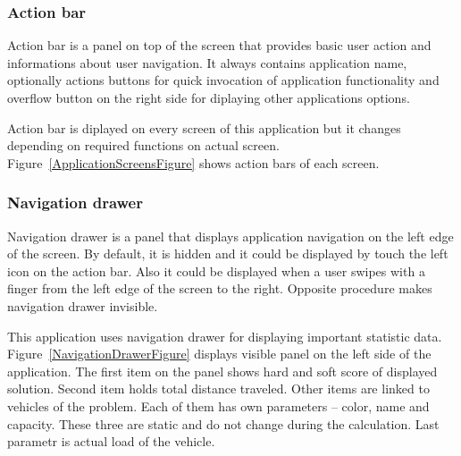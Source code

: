 \subsubsection{Action bar}
Action bar is a panel on top of the screen that provides basic user action and informations about user navigation. It
always contains application name, optionally actions buttons for quick invocation of application functionality and
overflow button on the right side for diplaying other applications options.

Action bar is diplayed on every screen of this application but it changes depending on required functions on actual
screen. Figure~\ref{ApplicationScreensFigure} shows action bars of each screen.

\subsubsection{Navigation drawer}
Navigation drawer is a panel that displays application navigation on the left edge of the screen. By default, it is
hidden and it could be displayed by touch the left icon on the action bar. Also it could be displayed when a user swipes
with a finger from the left edge of the screen to the right. Opposite procedure makes navigation drawer invisible.

This application uses navigation drawer for displaying important statistic data. Figure~\ref{NavigationDrawerFigure}
displays visible panel on the left side of the application. The first item on the panel shows hard and soft score of
displayed solution. Second item holds total distance traveled. Other items are linked to vehicles of the problem. Each
of them has own parameters -- color, name and capacity. These three are static and do not change during the calculation.
Last parametr is actual load of the vehicle.

